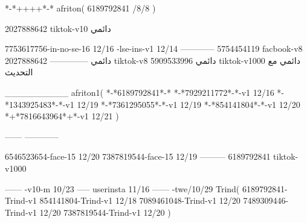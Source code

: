 *-*++++*-*
afriton(
6189792841 /8/8
)

2027888642 tiktok-v10
دائمي

7753617756-in-no-se-16 12/16
-lse-ins-v1 12/14
------------
5754454119 facbook-v8
دائمي
--------------
2027888642 tiktok-v8
دائمي
5909533996 tiktok-v1000
دائمي مع التحديث

__________
afriton1(
*-*6189792841*-*
*-*7929211772*-*-v1 12/16
*-*1343925483*-*-v1 12/19
*-*7361295055*-*-v1 12/19
*-*854141804*-*-v1 12/20
*+*7816643964*+*-v1 12/21
)

------
------------


6546523654-face-15 12/20
7387819544-face-15 12/19
---------
6189792841 tiktok-v1000
 
------
-v10-m 10/23
-----
userinsta 11/16
------
-twe/10/29
Trind(
6189792841-Trind-v1 
854141804-Trind-v1 12/18
7089461048-Trind-v1 12/20
7489309446-Trind-v1 12/20
7387819544-Trind-v1 12/20
)
